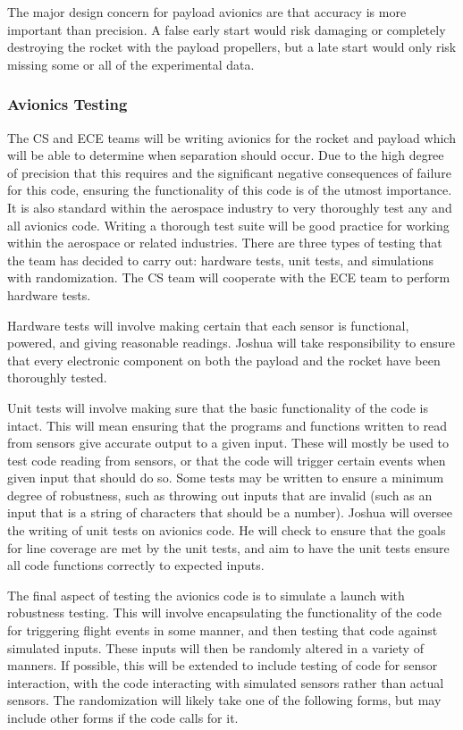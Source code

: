 \documentclass[onecolumn, draftclsnofoot, 10pt, compsoc]{IEEEtran}
\begin{document}
The major design concern for payload avionics are that accuracy is more important than precision.  A false early start would risk damaging or completely destroying the rocket with the payload propellers, but a late start would only risk missing some or all of the experimental data.

\subsubsection{Avionics Testing}
The CS and ECE teams will be writing avionics for the rocket and payload which will be able to determine when separation should occur. Due to the high degree of precision that this requires and the significant negative consequences of failure for this code, ensuring the functionality of this code is of the utmost importance. It is also standard within the aerospace industry to very thoroughly test any and all avionics code.  Writing a thorough test suite will be good practice for working within the aerospace or related industries. There are three types of testing that the team has decided to carry out: hardware tests, unit tests, and simulations with randomization. The CS team will cooperate with the ECE team to perform hardware tests.

Hardware tests will involve making certain that each sensor is functional, powered, and giving reasonable readings.  Joshua will take responsibility to ensure that every electronic component on both the payload and the rocket have been thoroughly tested.

Unit tests will involve making sure that the basic functionality of the code is intact. This will mean ensuring that the programs and functions written to read from sensors give accurate output to a given input. These will mostly be used to test code reading from sensors, or that the code will trigger certain events when given input that should do so. Some tests may be written to ensure a minimum degree of robustness, such as throwing out inputs that are invalid (such as an input that is a string of characters that should be a number). Joshua will oversee the writing of unit tests on avionics code. He will check to ensure that the goals for line coverage are met by the unit tests, and aim to have the unit tests ensure all code functions correctly to expected inputs.

The final aspect of testing the avionics code is to simulate a launch with robustness testing. This will involve encapsulating the functionality of the code for triggering flight events in some manner, and then testing that code against simulated inputs. These inputs will then be randomly altered in a variety of manners. If possible, this will be extended to include testing of code for sensor interaction, with the code interacting with simulated sensors rather than actual sensors. The randomization will likely take one of the following forms, but may include other forms if the code calls for it.
\end{document}
